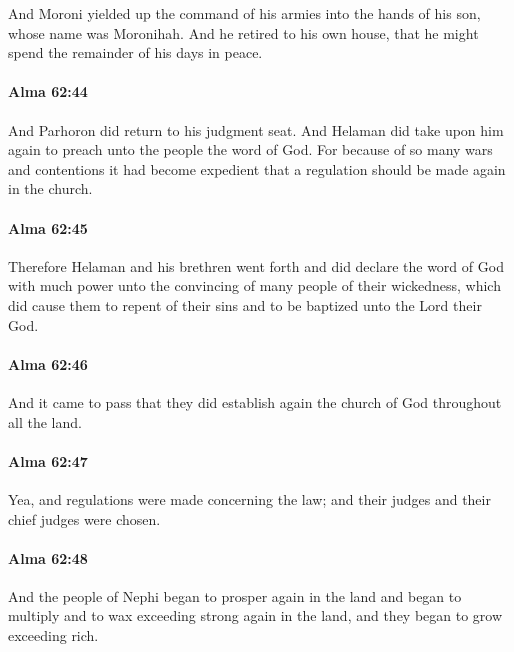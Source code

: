 			And Moroni yielded up the command of his armies
			into the hands of his son, whose name was Moronihah.
			And he retired to his own house,
			that he might spend the remainder of his days in peace.

		\paragraph{Alma 62:44} %
			\label{ALMA-62-44}

			And Parhoron did return to his judgment seat.
			And Helaman did take upon him again
			to preach unto the people the word of God.
			For because of so many wars and contentions
			it had become expedient
			that a regulation should be made again in the church.

		\paragraph{Alma 62:45} %
			\label{ALMA-62-45}

			Therefore Helaman and his brethren went forth
			and did declare the word of God with much power
			unto the convincing of many people of their wickedness,
			which did cause them to repent of their sins
			and to be baptized unto the Lord their God.

		\paragraph{Alma 62:46} %
			\label{ALMA-62-46}

			And it came to pass that
			they did establish again the church of God throughout all the land.

		\paragraph{Alma 62:47} %
			\label{ALMA-62-47}

			Yea, and regulations were made concerning the law;
			and their judges and their chief judges were chosen.

		\paragraph{Alma 62:48} %
			\label{ALMA-62-48}

			And the people of Nephi began to prosper again in the land
			and began to multiply and to wax exceeding strong again in the land,
			and they began to grow exceeding rich.

